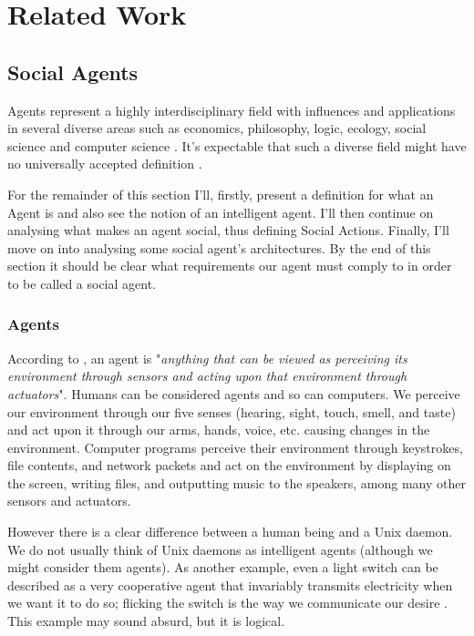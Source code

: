 \section{Related Work}

\subsection{Social Agents}
Agents represent a highly interdisciplinary field with influences and applications in several diverse areas such as economics, philosophy, logic, ecology, social science and computer science \cite{wooldridge:multiagent-systems}.
It's expectable that such a diverse field might have no universally accepted definition \cite{wooldridge:intelligentagents}.

For the remainder of this section I'll, firstly, present a definition for what an Agent is and also see the notion of an intelligent agent.
I'll then continue on analysing what makes an agent social, thus defining Social Actions.
Finally, I'll move on into analysing some social agent's architectures.
By the end of this section it should be clear what requirements our agent must comply to in order to be called a social agent.

\subsubsection{Agents}
According to \cite{russell&norvig:aima}, an agent is "\textit{anything that can be viewed as perceiving its environment through sensors and acting upon that environment through actuators}".
Humans can be considered agents and so can computers.
We perceive our environment through our five senses (hearing, sight, touch, smell, and taste) and act upon it through our arms, hands, voice, etc. causing changes in the environment.
Computer programs perceive their environment through keystrokes, file contents, and network packets and act on the environment by displaying on the screen, writing files, and outputting music to the speakers, among many other sensors and actuators.

However there is a clear difference between a human being and a Unix daemon.
We do not usually think of Unix daemons as intelligent agents (although we might consider them agents).
As another example, even a light switch can be described as a very cooperative agent that invariably transmits electricity when we want it to do so; flicking the switch is the way we communicate our desire \cite{shoham:agentorientedprogramming}.
This example may sound absurd, but it is logical.

